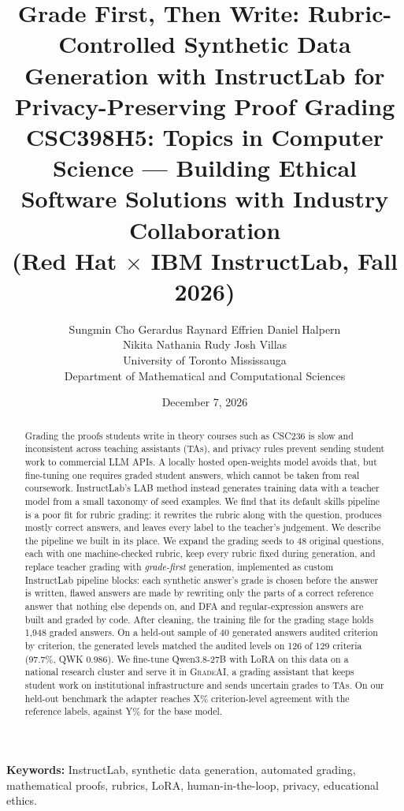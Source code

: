 \documentclass[11pt,a4paper]{article}
\title{\textbf{Grade First, Then Write: Rubric-Controlled Synthetic Data Generation with InstructLab for Privacy-Preserving Proof Grading}\\[0.6em]
\large CSC398H5: Topics in Computer Science --- Building Ethical Software Solutions with Industry Collaboration \\
(Red Hat $\times$ IBM InstructLab, Fall 2026)}
\author{%
  Sungmin Cho \hspace{1em} Gerardus Raynard Effrien \hspace{1em} Daniel Halpern\\
Nikita Nathania Rudy \hspace{1em} Josh Villas\\[0.5em]
  University of Toronto Mississauga\\
  Department of Mathematical and Computational Sciences
}
\date{December 7, 2026}
\newif\ifdraft
\newcommand{\todo}[2]{%
  \ifdraft\textcolor{red}{\textbf{[TODO #1:} #2\textbf{]}}\fi}
\newcommand{\ph}[1]{\ifdraft\textcolor{blue!70!black}{#1}\else #1\fi}
\newcommand{\gradeai}{\textsc{GradeAI}}
\theoremstyle{definition}
\begin{document}
\maketitle
\begin{center}\todo{}{Authors are listed alphabetically by surname; change the order if the team prefers.}\end{center}

\begin{abstract}
Grading the proofs students write in theory courses such as CSC236 is slow and inconsistent across teaching assistants (TAs), and privacy rules prevent sending student work to commercial LLM APIs. A locally hosted open-weights model avoids that, but fine-tuning one requires graded student answers, which cannot be taken from real coursework. InstructLab's LAB method instead generates training data with a teacher model from a small taxonomy of seed examples. We find that its default skills pipeline is a poor fit for rubric grading: it rewrites the rubric along with the question, produces mostly correct answers, and leaves every label to the teacher's judgement. We describe the pipeline we built in its place. We expand the grading seeds to 48 original questions, each with one machine-checked rubric, keep every rubric fixed during generation, and replace teacher grading with \emph{grade-first} generation, implemented as custom InstructLab pipeline blocks: each synthetic answer's grade is chosen before the answer is written, flawed answers are made by rewriting only the parts of a correct reference answer that nothing else depends on, and DFA and regular-expression answers are built and graded by code. After cleaning, the training file for the grading stage holds 1,948 graded answers. On a held-out sample of 40 generated answers audited criterion by criterion, the generated levels matched the audited levels on 126 of 129 criteria (97.7\%, QWK 0.986). We fine-tune Qwen3.8-27B with LoRA on this data on a national research cluster and serve it in \gradeai{}, a grading assistant that keeps student work on institutional infrastructure and sends uncertain grades to TAs. \ph{On our held-out benchmark the adapter reaches X\% criterion-level agreement with the reference labels, against Y\% for the base model.}
\end{abstract}

\noindent\textbf{Keywords:} InstructLab, synthetic data generation, automated grading, mathematical proofs, rubrics, LoRA, human-in-the-loop, privacy, educational ethics.
\end{document}
